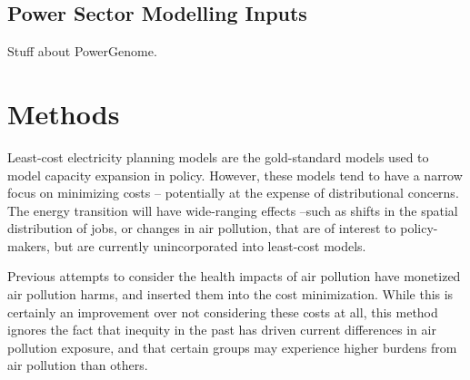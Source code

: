 \documentclass[a4paper]{article}
\theoremstyle{definition}
\theoremstyle{plain}
\begin{document}
\subsection{Power Sector Modelling Inputs}
Stuff about PowerGenome.

\section{Methods}

Least-cost electricity planning models are the gold-standard models used to model capacity expansion in policy.  However, these models tend to have a narrow focus on minimizing costs -- potentially at the expense of distributional concerns.  The energy transition will have wide-ranging effects --such as shifts in the spatial distribution of jobs, or changes in air pollution, that are of interest to policy-makers, but are currently unincorporated into least-cost models.

Previous attempts to consider the health impacts of air pollution have monetized air pollution harms, and inserted them into the cost minimization.  While this is certainly an improvement over not considering these costs at all, this method ignores the fact that inequity in the past has driven current differences in air pollution exposure, and that certain groups may experience higher burdens from air pollution than others.
\end{document}
